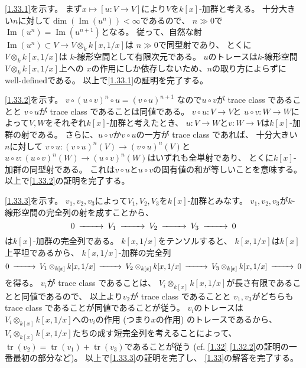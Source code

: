 \documentclass[uplatex,dvipdfmx]{jsarticle}
\makeatletter
\theoremstyle{definition}
\renewenvironment{proof}[1][\proofname]{
  \pushQED{\qed}%
  \normalfont \topsep6\p@\@plus6\p@\relax
  \trivlist
  \item[\hskip\labelsep
    #1\@addpunct{\textbf{.}}]\ignorespaces
}{%
  \popQED\endtrivlist\@endpefalse
}
\providecommand{\proofname}{証明}
\DeclareMathOperator{\im}{\mathrm{Im}}
\DeclareMathOperator{\tr}{\mathrm{tr}}
\makeatother
\begin{document}
\begin{proof}
  \ref{1.33.1}を示す。
  まず\(x\mapsto [u:V\to V]\)により\(V\)を\(k[x]\)-加群と考える。
  十分大きい\(n\)に対して\(\dim(\im(u^n)) < \infty\)であるので、
  \(n \gg 0\)で\(\im(u^n) = \im(u^{n+1})\)となる。
  従って、自然な射\(\im(u^n) \subset V\to V\otimes_k k[x,1/x]\)は
  \(n \gg 0\)で同型射であり、
  とくに\(V\otimes_k k[x,1/x]\)は
  \(k\)-線形空間として有限次元である。
  \(u\)のトレースは\(k\)-線形空間\(V\otimes_k k[x,1/x]\)上への
  \(x\)の作用にしか依存しないため、\(n\)の取り方によらずにwell-definedである。
  以上で\ref{1.33.1}の証明を完了する。

  \ref{1.33.2}を示す。
  \(v\circ (u\circ v)^n\circ u = (v\circ u)^{n+1}\)
  なので\(u\circ v\)が trace class であることと
  \(v\circ u\)が trace class であることは同値である。
  \(v\circ u:V\to V\)と
  \(u\circ v:W\to W\)によって\(V,W\)をそれぞれ\(k[x]\)-加群と考えたとき、
  \(u:V\to W\)と\(v:W\to V\)は\(k[x]\)-加群の射である。
  さらに、\(u\circ v\)か\(v\circ u\)の一方が trace class であれば、
  十分大きい\(n\)に対して
  \(v\circ u:(v\circ u)^n (V) \to (v\circ u)^n (V)\)と
  \(u\circ v:(u\circ v)^n (W) \to (u\circ v)^n (W)\)はいずれも全単射であり、
  とくに\(k[x]\)-加群の同型射である。
  これは\(v\circ u\)と\(u\circ v\)の固有値の和が等しいことを意味する。
  以上で\ref{1.33.2}の証明を完了する。

  \ref{1.33.3}を示す。
  \(v_1,v_2,v_3\)によって\(V_1,V_2,V_3\)を\(k[x]\)-加群とみなす。
  \(v_1,v_2,v_3\)が\(k\)-線形空間の完全列の射を成すことから、
  \[
  \begin{CD}
    0 @>>> V_1 @>>> V_2 @>>> V_3 @>>> 0
  \end{CD}
  \]
  は\(k[x]\)-加群の完全列である。
  \(k[x,1/x]\)をテンソルすると、
  \(k[x,1/x]\)は\(k[x]\)上平坦であるから、
  \(k[x,1/x]\)-加群の完全列
  \[
  \begin{CD}
    0 @>>> V_1\otimes_{k[x]}k[x,1/x] @>>> V_2\otimes_{k[x]}k[x,1/x]
    @>>> V_3\otimes_{k[x]}k[x,1/x] @>>> 0
  \end{CD}
  \]
  を得る。
  \(v_i\)が trace class であることは、
  \(V_i\otimes_{k[x]}k[x,1/x]\)が長さ有限であることと同値であるので、
  以上より\(v_2\)が trace class であることと
  \(v_1,v_3\)がどちらも trace class であることが同値であることが従う。
  \(v_i\)のトレースは\(V_i\otimes_{k[x]}k[x,1/x]\)への\(v_i\)の作用
  (つまり\(x\)の作用)
  のトレースであるから、
  \(V_i\otimes_{k[x]}k[x,1/x]\)たちの成す短完全列を考えることによって、
  \(\tr(v_2) = \tr(v_1) + \tr(v_3)\)であることが従う
  (cf. \autoref{1.32} \ref{1.32.2}の証明の一番最初の部分など)。
  以上で\ref{1.33.3}の証明を完了し、
  \autoref{1.33}の解答を完了する。
\end{proof}
\end{document}
